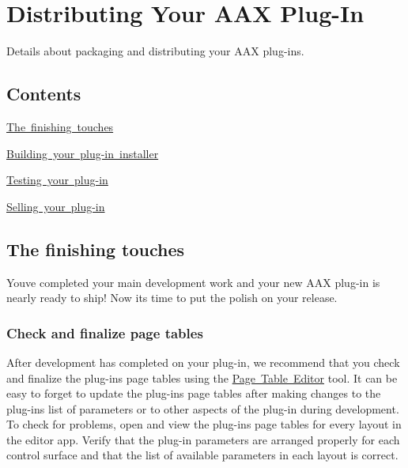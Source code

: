 \hypertarget{a00843}{}\section{Distributing Your A\+AX Plug-\/\+In}
\label{a00843}
Details about packaging and distributing your A\+AX plug-\/ins. 

\hypertarget{a00843_aax_distributing_contents}{}\subsection{Contents}\label{a00843_aax_distributing_contents}

\begin{DoxyItemize}
\item \mbox{\hyperlink{a00843_aax_distributing_finishing}{The finishing touches}}
\item \mbox{\hyperlink{a00843_aax_distributing_installer}{Building your plug-\/in installer}}
\item \mbox{\hyperlink{a00843_aax_distributing_testing}{Testing your plug-\/in}}
\item \mbox{\hyperlink{a00843_aax_distributing_selling}{Selling your plug-\/in}}
\end{DoxyItemize}

 \hypertarget{a00843_aax_distributing_finishing}{}\subsection{The finishing touches}\label{a00843_aax_distributing_finishing}
 You\textquotesingle{}ve completed your main development work and your new A\+AX plug-\/in is nearly ready to ship! Now it\textquotesingle{}s time to put the polish on your release.

\hypertarget{a00843_aax_distributing_finishing_pagetables}{}\subsubsection{Check and finalize page tables}\label{a00843_aax_distributing_finishing_pagetables}
 After development has completed on your plug-\/in, we recommend that you check and finalize the plug-\/in\textquotesingle{}s page tables using the \mbox{\hyperlink{a00833_subsection_creating_page_tables_in_pete}{Page Table Editor}} tool. It can be easy to forget to update the plug-\/in\textquotesingle{}s page tables after making changes to the plug-\/in\textquotesingle{}s list of parameters or to other aspects of the plug-\/in during development. To check for problems, open and view the plug-\/in\textquotesingle{}s page tables for every layout in the editor app. Verify that the plug-\/in parameters are arranged properly for each control surface and that the list of available parameters in each layout is correct.

